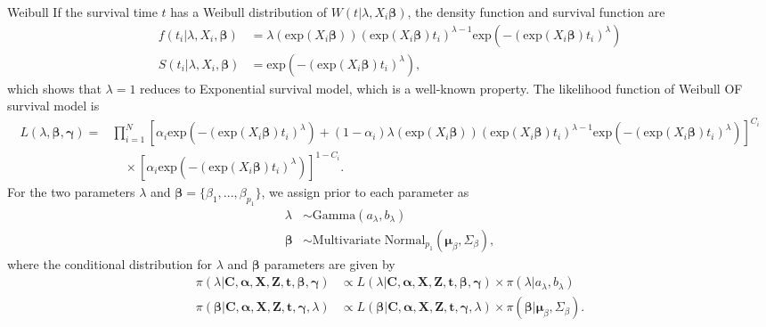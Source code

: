 \documentclass[a4paper, 12pt]{article}
\makeatletter
\renewcommand{\subsection}{\@startsection
	{subsection}    {2}    {0mm}    {-0.5\baselineskip}    {0.01\baselineskip}    {\normalfont\normalsize\itshape\center}}
\makeatother
\begin{document}
\subsection{Weibull}
\noindent 
If the survival time $t$ has a Weibull distribution of $W(t|\lambda, X_i\mathbf{\beta})$, the density function and survival function are
\begin{equation}
\begin{aligned}
f(t_i|\lambda, X_i, \mathbf{\beta}) &= \lambda(\mbox{exp}(X_i\mathbf{\beta})) (\mbox{exp}(X_i\mathbf{\beta})t_i)^{\lambda - 1} \mbox{exp}(-(\mbox{exp}(X_i\mathbf{\beta})t_i)^{\lambda})\\
S(t_i|\lambda, X_i, \mathbf{\beta}) &= \mbox{exp}(-(\mbox{exp}(X_i\mathbf{\beta})t_i)^{\lambda}),
\end{aligned}
\end{equation}
which shows that $\lambda=1$ reduces to Exponential survival model, which is a well-known property. The likelihood function of Weibull OF survival model is
\begin{equation}
\begin{aligned}
L(\lambda, \mathbf{\beta}, \mathbf{\gamma})=&\prod\limits_{i=1}^{N}[\alpha _{i}\mbox{exp}(-(\mbox{exp}(X_i\mathbf{\beta})t_i)^{\lambda})+(1-\alpha _{i})\lambda(\mbox{exp}(X_i\mathbf{\beta})) (\mbox{exp}(X_i\mathbf{\beta})t_i)^{\lambda - 1} \mbox{exp}(-(\mbox{exp}(X_i\mathbf{\beta})t_i)^{\lambda})]^{C_{i}}\\&\quad\times [\alpha _{i}\mbox{exp}(-(\mbox{exp}(X_i\mathbf{\beta})t_i)^{\lambda})]^{1-C_{i}}.
\end{aligned}
\end{equation}
For the two parameters $\lambda$ and $\mathbf{\beta}=\{\beta_1,...,\beta_{p_1}\}$, we assign prior to each parameter as
\begin{equation}
\begin{aligned}
\lambda &\sim \mbox{Gamma}(a_{\lambda}, b_{\lambda})\\
\mathbf{\beta} &\sim \mbox{Multivariate Normal}_{p_1}(\mathbf{\mu}_{\beta}, \Sigma_{\beta}),
\end{aligned}
\end{equation}
where the conditional distribution for $\lambda$ and $\mathbf{\beta}$ parameters are given by
\begin{equation}
\begin{aligned}
\pi(\lambda|\mathbf{C}, \mathbf{\alpha}, \mathbf{X}, \mathbf{Z}, \mathbf{t}, \mathbf{\beta}, \mathbf{\gamma}) &\propto L(\lambda|\mathbf{C}, \mathbf{\alpha}, \mathbf{X}, \mathbf{Z}, \mathbf{t}, \mathbf{\beta}, \mathbf{\gamma})\times \pi(\lambda|a_{\lambda}, b_{\lambda})\\
\pi(\mathbf{\beta}|\mathbf{C}, \mathbf{\alpha}, \mathbf{X}, \mathbf{Z}, \mathbf{t}, \mathbf{\gamma}, \lambda) &\propto L(\mathbf{\beta}|\mathbf{C}, \mathbf{\alpha}, \mathbf{X}, \mathbf{Z}, \mathbf{t}, \mathbf{\gamma}, \lambda)\times \pi(\mathbf{\beta}|\mathbf{\mu}_{\beta}, \Sigma_{\beta}).
\end{aligned}
\end{equation}
\end{document}

